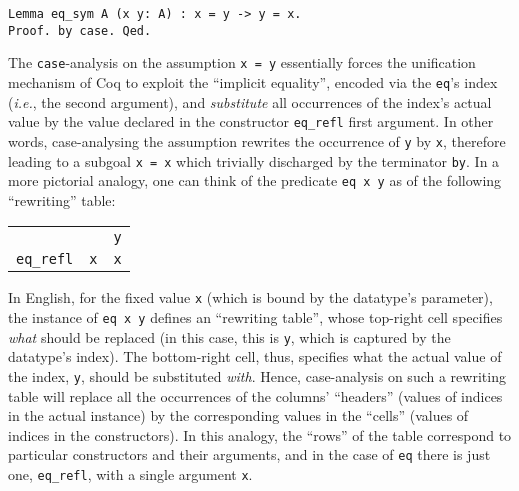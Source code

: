 \documentclass[blockstyle,preprint]{sigplanconf}
\newcommand{\code}[1]{\lstinline{#1}}
\newcommand{\ie}{\emph{i.e.}\xspace}
\begin{document}

\begin{lstlisting}
Lemma eq_sym A (x y: A) : x = y -> y = x.
Proof. by case. Qed.
\end{lstlisting}

The \code{case}-analysis on the assumption \code{x = y} essentially
forces the unification mechanism of Coq to exploit the ``implicit
equality'', encoded via the \code{eq}'s index (\ie, the second
argument), and \emph{substitute} all occurrences of the index's actual
value by the value declared in the constructor \code{eq_refl} first
argument. In other words, case-analysing the assumption rewrites the
occurrence of \code{y} by \code{x}, therefore leading to a subgoal
\code{x = x} which trivially discharged by the terminator
\code{by}. In a more pictorial analogy, one can think of the predicate
\code{eq x y} as of the following ``rewriting'' table:

\vspace{5pt}

\begin{center}
\hspace{-20pt}
  \begin{tabular}{r|r|c|}
    \cline{3-3}
    \multicolumn{2}{c|}{} & \code{y}
    \\
    \cline{2-3} 
    \multicolumn{1}{r}{\code{eq_refl}} &\multicolumn{1}{|c||}{\code{x}} & \code{x}
    \\    \cline{2-3}
  \end{tabular}
\end{center}

\vspace{5pt}

In English, for the fixed value \code{x} (which is bound by the
datatype's parameter), the instance of \code{eq x y} defines an
``rewriting table'', whose top-right cell specifies \emph{what} should
be replaced (in this case, this is \code{y}, which is captured by the
datatype's index). The bottom-right cell, thus, specifies what the
actual value of the index, \code{y}, should be substituted
\emph{with}. Hence, case-analysis on such a rewriting table will
replace all the occurrences of the columns' ``headers'' (values of
indices in the actual instance) by the corresponding values in the
``cells'' (values of indices in the constructors). In this analogy,
the ``rows'' of the table correspond to particular constructors and
their arguments, and in the case of \code{eq} there is just one,
\code{eq_refl}, with a single argument \code{x}.
\end{document}
